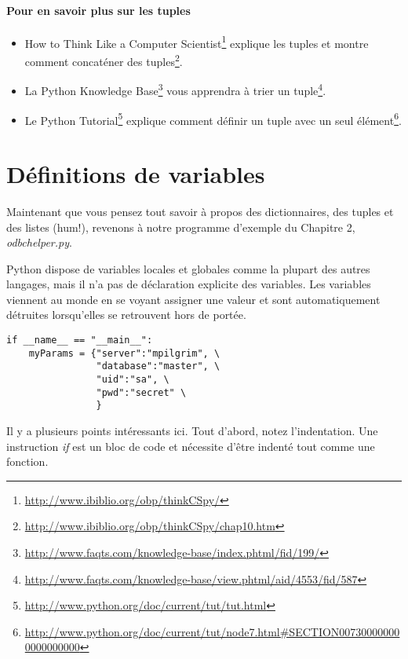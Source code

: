 \paragraph{Pour en savoir plus sur les tuples}
\begin{itemize}
\item{How to Think Like a Computer Scientist\footnote{\url{http://www.ibiblio.org/obp/thinkCSpy/}} explique les tuples et montre comment concaténer des tuples\footnote{\url{http://www.ibiblio.org/obp/thinkCSpy/chap10.htm}}.}
\item{La Python Knowledge Base\footnote{\url{http://www.faqts.com/knowledge-base/index.phtml/fid/199/}} vous apprendra à trier un tuple\footnote{\url{http://www.faqts.com/knowledge-base/view.phtml/aid/4553/fid/587}}.}
\item{Le Python Tutorial\footnote{\url{http://www.python.org/doc/current/tut/tut.html}} explique comment définir un tuple avec un seul élément\footnote{\url{http://www.python.org/doc/current/tut/node7.html\#SECTION007300000000000000000}}.}
\end{itemize}

\section{Définitions de variables}

Maintenant que vous pensez tout savoir à propos des dictionnaires, des tuples et des listes (hum!), revenons à notre programme d'exemple du Chapitre 2, \emph{odbchelper.py}.

Python dispose de variables locales et globales comme la plupart des autres langages, mais il n'a pas de déclaration explicite des variables. Les variables viennent au monde en se voyant assigner une valeur et sont automatiquement détruites lorsqu'elles se retrouvent hors de portée.

\begin{example}
\begin{lstlisting}
if __name__ == "__main__":
    myParams = {"server":"mpilgrim", \
                "database":"master", \
                "uid":"sa", \
                "pwd":"secret" \
                }
\end{lstlisting}
\end{example}

Il y a plusieurs points intéressants ici. Tout d'abord, notez l'indentation. Une instruction \emph{if} est un bloc de code et nécessite d'être indenté tout comme une fonction.

